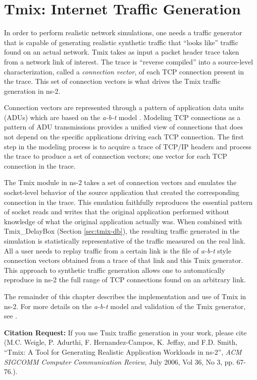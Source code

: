 %

\chapter{Tmix: Internet Traffic Generation}
\label{chap:tmix}

In order to perform realistic network simulations, one needs a traffic generator that is capable of generating realistic synthetic traffic that ``looks like'' traffic found on an actual network. Tmix takes as input a packet header trace taken from a network link of interest. The trace is ``reverse compiled'' into a source-level characterization, called a \emph{connection vector}, of each TCP connection present in the trace.  This set of connection vectors is what drives the Tmix traffic generation in ns-2.  

Connection vectors are represented through a pattern of application data units (ADUs) which are based on the \emph{a-b-t} model \cite{weigle-ccr06}.  Modeling TCP connections as a pattern of ADU transmissions provides a unified view of connections that does not depend on the specific applications driving each TCP connection.  The first step in the modeling process is to acquire a trace of TCP/IP headers and process the trace to produce a set of connection vectors; one vector for each TCP connection in the trace.

The Tmix module in ns-2 takes a set of connection vectors and emulates the socket-level behavior of the source application that created the corresponding connection in the trace. This emulation faithfully reproduces the essential pattern of socket reads and writes that the original application performed without knowledge of what the original application actually was. When combined with Tmix\_DelayBox (Section \ref{sec:tmix-db}), the resulting traffic generated in the simulation is statistically representative of the traffic measured on the real link. All a user needs to replay traffic from a certain link is the file of \emph{a-b-t} style connection vectors obtained from a trace of that link and this Tmix generator. This approach to synthetic traffic generation allows one to automatically reproduce in ns-2 the full range of TCP connections found on an arbitrary link.

The remainder of this chapter describes the implementation and use of Tmix in ns-2.  For more details on the \emph{a-b-t} model and validation of the Tmix generator, see \cite{weigle-ccr06}.

\textbf{Citation Request:}  If you use Tmix traffic generation in your work, please cite \cite{weigle-ccr06} (M.C. Weigle, P. Adurthi, F. Hernandez-Campos, K. Jeffay, and F.D. Smith, ``Tmix: A Tool for Generating Realistic Application Workloads in ns-2'', \emph{ACM SIGCOMM Computer Communication Review}, July 2006, Vol 36, No 3, pp. 67-76.).

